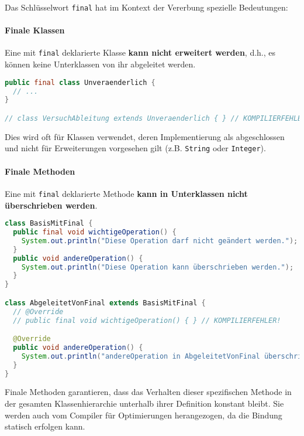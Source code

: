 Das Schlüsselwort \texttt{final} hat im Kontext der Vererbung spezielle Bedeutungen:

\paragraph{Finale Klassen}
Eine mit \texttt{final} deklarierte Klasse \textbf{kann nicht erweitert werden}, d.h., es können keine Unterklassen von ihr abgeleitet werden.
\begin{lstlisting}[language=Java, caption={\texttt{final} Klasse}]
public final class Unveraenderlich {
  // ...
}

// class VersuchAbleitung extends Unveraenderlich { } // KOMPILIERFEHLER!
\end{lstlisting}
Dies wird oft für Klassen verwendet, deren Implementierung als abgeschlossen und nicht für Erweiterungen vorgesehen gilt (z.B. \texttt{String} oder \texttt{Integer}).

\paragraph{Finale Methoden}
Eine mit \texttt{final} deklarierte Methode \textbf{kann in Unterklassen nicht überschrieben werden}.
\begin{lstlisting}[language=Java, caption={\texttt{final} Methode}]
class BasisMitFinal {
  public final void wichtigeOperation() {
    System.out.println("Diese Operation darf nicht geändert werden.");
  }
  public void andereOperation() {
    System.out.println("Diese Operation kann überschrieben werden.");
  }
}

class AbgeleitetVonFinal extends BasisMitFinal {
  // @Override
  // public final void wichtigeOperation() { } // KOMPILIERFEHLER!

  @Override
  public void andereOperation() {
    System.out.println("andereOperation in AbgeleitetVonFinal überschrieben.");
  }
}
\end{lstlisting}
Finale Methoden garantieren, dass das Verhalten dieser spezifischen Methode in der gesamten Klassenhierarchie unterhalb 
ihrer Definition konstant bleibt. Sie werden auch vom Compiler für Optimierungen herangezogen, da die Bindung statisch erfolgen kann.

